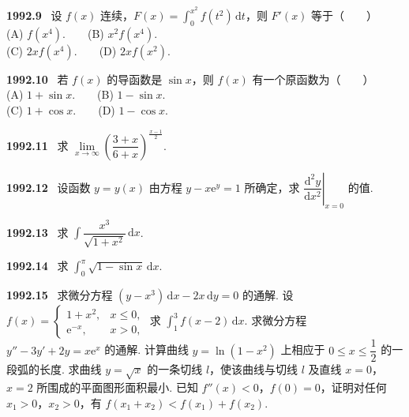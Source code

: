 \documentclass[UTF8,12pt]{ctexart}
\newcommand{\qn}[1]{\textbf{\large #1}\ }
\begin{document}
\vfill
\newpage
\qn{1992.9}
设 $f(x)$ 连续，$F(x)=\int_0^{x^2}f(t^2)\,\mathrm{d}t$，则 $F'(x)$ 等于（　　）
\\
\noindent (A) $f(x^4)$.　　(B) $x^2f(x^4)$.
\\
\noindent (C) $2xf(x^4)$.　　(D) $2xf(x^2)$.

\vfill
\newpage
\qn{1992.10}
若 $f(x)$ 的导函数是 $\sin x$，则 $f(x)$ 有一个原函数为（　　）
\\
\noindent (A) $1+\sin x$.　　(B) $1-\sin x$.
\\
\noindent (C) $1+\cos x$.　　(D) $1-\cos x$.

\vfill
\newpage
\qn{1992.11}
求 $\lim\limits_{x\to\infty}\left(\dfrac{3+x}{6+x}\right)^{\frac{x-1}{2}}$.

\vfill
\newpage
\qn{1992.12}
设函数 $y=y(x)$ 由方程 $y-x\mathrm{e}^y=1$ 所确定，求 $\left.\dfrac{\mathrm{d}^2y}{\mathrm{d}x^2}\right|_{x=0}$ 的值.

\vfill
\newpage
\qn{1992.13}
求 $\int\dfrac{x^3}{\sqrt{1+x^2}}\,\mathrm{d}x$.

\vfill
\newpage
\qn{1992.14}
求 $\int_0^\pi\sqrt{1-\sin x}\,\mathrm{d}x$.

\vfill
\newpage
\qn{1992.15}
求微分方程 $(y-x^3)\,\mathrm{d}x-2x\,\mathrm{d}y=0$ 的通解.
设 $f(x)=\begin{cases} 1+x^2, & x\leqslant 0, \\ \mathrm{e}^{-x}, & x>0, \end{cases}$ 求 $\int_1^3 f(x-2)\,\mathrm{d}x$.
求微分方程 $y''-3y'+2y=x\mathrm{e}^x$ 的通解.
计算曲线 $y=\ln(1-x^2)$ 上相应于 $0\leqslant x\leqslant\dfrac{1}{2}$ 的一段弧的长度.
求曲线 $y=\sqrt{x}$ 的一条切线 $l$，使该曲线与切线 $l$ 及直线 $x=0$，$x=2$ 所围成的平面图形面积最小.
已知 $f''(x)<0$，$f(0)=0$，证明对任何 $x_1>0$，$x_2>0$，有 $f(x_1+x_2)<f(x_1)+f(x_2)$.

\vfill
\newpage
\end{document}
